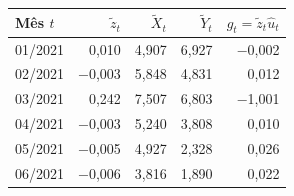 \begin{tabular}{lrrrr}
\toprule
Mês $t$ & $\tilde z_t$ & $\tilde X_t$ & $\tilde Y_t$ & $g_t=\tilde z_t\hat u_t$ \\
\midrule
01/2021 & 0{,}010 & 4{,}907 & 6{,}927 & \ensuremath{-}0{,}002 \\
02/2021 & \ensuremath{-}0{,}003 & 5{,}848 & 4{,}831 & 0{,}012 \\
03/2021 & 0{,}242 & 7{,}507 & 6{,}803 & \ensuremath{-}1{,}001 \\
04/2021 & \ensuremath{-}0{,}003 & 5{,}240 & 3{,}808 & 0{,}010 \\
05/2021 & \ensuremath{-}0{,}005 & 4{,}927 & 2{,}328 & 0{,}026 \\
06/2021 & \ensuremath{-}0{,}006 & 3{,}816 & 1{,}890 & 0{,}022 \\
\bottomrule
\end{tabular}

